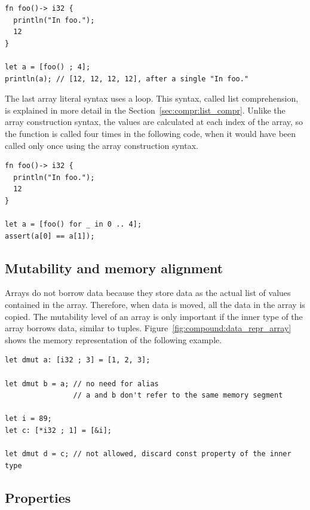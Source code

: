 \begin{lstlisting}[style=coloredverbatim]
fn foo()-> i32 {
  println("In foo.");
  12
}

let a = [foo() ; 4];
println(a); // [12, 12, 12, 12], after a single "In foo."
\end{lstlisting}

\smallskip
The last array literal syntax uses a  loop. This syntax, called list
comprehension, is explained in more detail in the Section~\ref{sec:compr:list_compr}.
Unlike the array construction syntax, the values are calculated at each index of
the array, so the function is called four times in the following code, when it
would have been called only once using the array construction syntax.

\begin{lstlisting}[style=coloredverbatim]
fn foo()-> i32 {
  println("In foo.");
  12
}

let a = [foo() for _ in 0 .. 4];
assert(a[0] == a[1]);
\end{lstlisting}


\subsection{Mutability and memory alignment}
Arrays do not borrow data because they store data as the actual list of values
contained in the array. Therefore, when data is moved, all the data in the array
is copied. The mutability level of an array is only important if the inner type
of the array borrows data, similar to tuples. Figure~\ref{fig:compound:data_repr_array}
shows the memory representation of the following example.

\begin{lstlisting}[style=coloredverbatimError]
let dmut a: [i32 ; 3] = [1, 2, 3];

let dmut b = a; // no need for alias
                // a and b don't refer to the same memory segment

let i = 89;
let c: [*i32 ; 1] = [&i];

let dmut d = c; // not allowed, discard const property of the inner type
\end{lstlisting}



\subsection{Properties}

